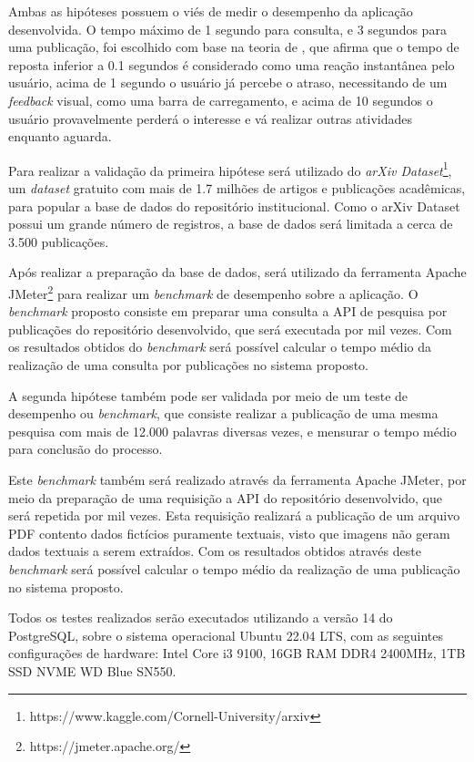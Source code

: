 Ambas as hipóteses possuem o viés de medir o desempenho da aplicação
desenvolvida. O tempo máximo de 1 segundo para consulta, e 3 segundos
para uma publicação, foi escolhido com base na teoria de \cite{1994:Nielsen},
que afirma que o tempo de reposta inferior a 0.1 segundos é considerado
como uma reação instantânea pelo usuário, acima de 1 segundo o usuário
já percebe o atraso, necessitando de um \emph{feedback} visual, como uma
barra de carregamento, e acima de 10 segundos o usuário provavelmente perderá
o interesse e vá realizar outras atividades enquanto aguarda.

Para realizar a validação da primeira hipótese será utilizado do
\emph{arXiv Dataset}\footnote{https://www.kaggle.com/Cornell-University/arxiv},
um \emph{dataset} gratuito com mais de 1.7 milhões de artigos e publicações acadêmicas,
para popular a base de dados do repositório institucional. Como o arXiv Dataset
possui um grande número de registros, a base de dados será limitada
a cerca de 3.500 publicações.

Após realizar a preparação da base de dados, será utilizado da ferramenta
Apache JMeter\footnote{https://jmeter.apache.org/} para realizar um \emph{benchmark}
de desempenho sobre a aplicação. O \emph{benchmark} proposto consiste em preparar
uma consulta a API de pesquisa por publicações do repositório desenvolvido, que será
executada por mil vezes. Com os resultados obtidos do \emph{benchmark} será possível
calcular o tempo médio da realização de uma consulta por publicações no sistema proposto.

A segunda hipótese também pode ser validada por meio de um teste de desempenho
ou \emph{benchmark}, que consiste realizar a publicação de uma mesma pesquisa
com mais de 12.000 palavras diversas vezes, e mensurar o tempo médio para conclusão
do processo.

Este \emph{benchmark} também será realizado através da ferramenta Apache JMeter,
por meio da preparação de uma requisição a API do repositório desenvolvido, que será
repetida por mil vezes. Esta requisição realizará a publicação de um arquivo PDF contento dados
fictícios puramente textuais, visto que imagens não geram dados textuais a serem extraídos.
Com os resultados obtidos através deste \emph{benchmark} será possível calcular o tempo médio
da realização de uma publicação no sistema proposto.

Todos os testes realizados serão executados utilizando
a versão 14 do PostgreSQL, sobre o sistema operacional Ubuntu 22.04 LTS,
com as seguintes configurações de hardware: Intel Core i3 9100, 16GB RAM DDR4 2400MHz,
1TB SSD NVME WD Blue SN550.

